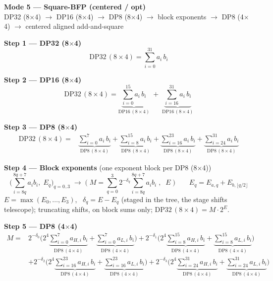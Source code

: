 \documentclass[fleqn]{article}
\newcommand{\DPop}[3]{\mathrm{DP#1}\,(#2\!\times\!#3)}
\begin{document}
\begin{center}
{\LARGE \textbf{Mode 5 --- Square-BFP (centered / opt)}}\\[4pt]
{\large DP32 (8$\times$4) $\rightarrow$ DP16 (8$\times$4) $\rightarrow$ DP8 (8$\times$4) $\rightarrow$ block exponents $\rightarrow$ DP8 (4$\times$4) $\rightarrow$ centered aligned add-and-square}
\end{center}

\textbf{Step 1 --- DP32 (8$\times$4)}
\[
\DPop{32}{8}{4} = \sum_{i=0}^{31} a_i \, b_i
\]

\textbf{Step 2 --- DP16 (8$\times$4)}
\[
\DPop{32}{8}{4}
  = \underbrace{\sum_{i=0}^{15} a_i \, b_i}_{\DPop{16}{8}{4}}
  \; + \; \underbrace{\sum_{i=16}^{31} a_i \, b_i}_{\DPop{16}{8}{4}}
\]

\textbf{Step 3 --- DP8 (8$\times$4)}
\begin{align*}
\DPop{32}{8}{4} = {}
  & \underbrace{\sum_{i=0}^{7} a_i \, b_i}_{\DPop{8}{8}{4}}
  + \underbrace{\sum_{i=8}^{15} a_i \, b_i}_{\DPop{8}{8}{4}}
  + \underbrace{\sum_{i=16}^{23} a_i \, b_i}_{\DPop{8}{8}{4}}
  + \underbrace{\sum_{i=24}^{31} a_i \, b_i}_{\DPop{8}{8}{4}}
\end{align*}

\textbf{Step 4 --- Block exponents}\quad
{\small(one exponent block per DP8 (8$\times$4))}
\[
\Big(\sum_{i=8q}^{8q+7} a_i b_i,\; E_q\Big)_{q=0..3}
\;\longrightarrow\;
\Big(\; M = \sum_{q=0}^{3} 2^{-\delta_q}\!\!\sum_{i=8q}^{8q+7}\! a_i b_i \;,\;\; E \;\Big)
\qquad
E_q = E_{a,q} + E_{b,\lfloor q/2\rfloor}
\]
$E=\max(E_0,\dots,E_3)$, \ $\delta_q=E-E_q$ (staged in the tree, the stage shifts telescope); \quad truncating shifts, on block sums only; \quad $\DPop{32}{8}{4}=M\cdot2^{E}$.

\textbf{Step 5 --- DP8 (4$\times$4)}
\begin{align*}
M = {}
  & 2^{-\delta_0}\Big( 2^{4}\underbrace{\sum_{i=0}^{7} a_{H,i}\, b_i}_{\DPop{8}{4}{4}}
  + \underbrace{\sum_{i=0}^{7} a_{L,i}\, b_i}_{\DPop{8}{4}{4}} \Big)
  + 2^{-\delta_1}\Big( 2^{4}\underbrace{\sum_{i=8}^{15} a_{H,i}\, b_i}_{\DPop{8}{4}{4}}
  + \underbrace{\sum_{i=8}^{15} a_{L,i}\, b_i}_{\DPop{8}{4}{4}} \Big) \\[0.15em]
  & + 2^{-\delta_2}\Big( 2^{4}\underbrace{\sum_{i=16}^{23} a_{H,i}\, b_i}_{\DPop{8}{4}{4}}
  + \underbrace{\sum_{i=16}^{23} a_{L,i}\, b_i}_{\DPop{8}{4}{4}} \Big)
  + 2^{-\delta_3}\Big( 2^{4}\underbrace{\sum_{i=24}^{31} a_{H,i}\, b_i}_{\DPop{8}{4}{4}}
  + \underbrace{\sum_{i=24}^{31} a_{L,i}\, b_i}_{\DPop{8}{4}{4}} \Big)
\end{align*}
\end{document}
